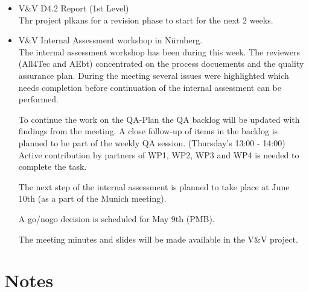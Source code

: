 \documentclass[a4paper, 11pt]{article}
\begin{document}
\begin{itemize}
\item V\&V D4.2 Report (1st Level)\\
Thr project plkans for a revision phase to start for the next 2 weeks. 
 
\item V\&V Internal Assessment workshop in N\"urnberg.\\
The internal assessment workshop has been during this week. 
The reviewers (All4Tec and AEbt) concentrated on the process docuements and the quality assurance plan. During the meeting several issues were highlighted which needs completion before continuation of the internal assessment can be  performed.

To continue the work on the QA-Plan the QA backlog will be updated with findings from the meeting. A close follow-up of items in the backlog is planned to be part of the weekly QA session. (Thursday's 13:00 - 14:00) Active contribution by partners of WP1, WP2, WP3 and WP4 is needed to complete the task.

The next step of the internal assessment is planned to take place at June 10th (as a part of the Munich meeting).

A go/nogo decision  is scheduled for May 9th (PMB).

The meeting minutes and slides will be made available  in the V\&V project.

\end{itemize}


\section{Notes}
\end{document}
